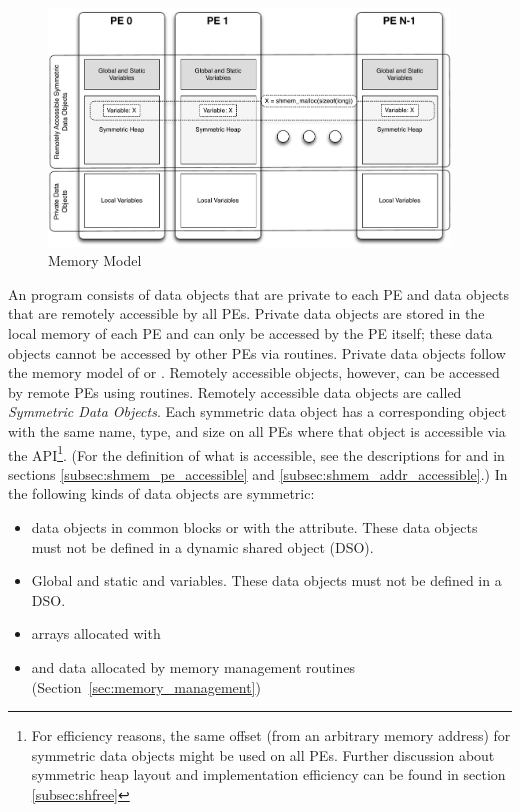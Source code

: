 \begin{figure}[h]
\includegraphics[width=0.95\textwidth]{figures/mem_model}      
\caption{\openshmem Memory Model}
\label{fig:mem_model}                                               
\end{figure}      
%
An \openshmem program consists of data objects that are private to each \ac{PE}
and data  objects that are remotely accessible by all \acp{PE}. Private data
objects are stored in the local memory of each \ac{PE} and can only be accessed
by the \ac{PE} itself; these data objects cannot be accessed by other \acp{PE}
via \openshmem routines. Private data objects follow the memory model of
\Cstd or \Fortran. Remotely accessible objects, however, can be accessed by
remote \acp{PE} using \openshmem routines.  Remotely accessible data objects are
called \emph{Symmetric Data Objects}.  Each symmetric data object has a
corresponding object with the same name, type, and size on all \acp{PE} where that object is
accessible via the \openshmem \ac{API}\footnote{For efficiency reasons,
the same offset (from an arbitrary memory address) for symmetric data
objects might be used on all \acp{PE}. Further discussion about symmetric heap
layout and implementation efficiency can be found in section
\ref{subsec:shfree}}.  (For the definition of what is accessible, see the
descriptions for  and 
in sections \ref{subsec:shmem_pe_accessible} and
\ref{subsec:shmem_addr_accessible}.) In \openshmem the following kinds of
data objects are symmetric:
%
\begin{itemize}
\item
  \begin{deprecate}
    \Fortran data objects in common blocks or with the  attribute.
    These data objects must not be defined in a dynamic shared object (DSO).
  \end{deprecate}
\item Global and static \Cstd and \Cpp variables. These data objects must
  not  be defined in a DSO.
\item
  \begin{deprecate}
    \Fortran arrays allocated with 
  \end{deprecate}
\item \Cstd and \Cpp data allocated by \openshmem memory management routines
  (Section~\ref{sec:memory_management})
\end{itemize}       


